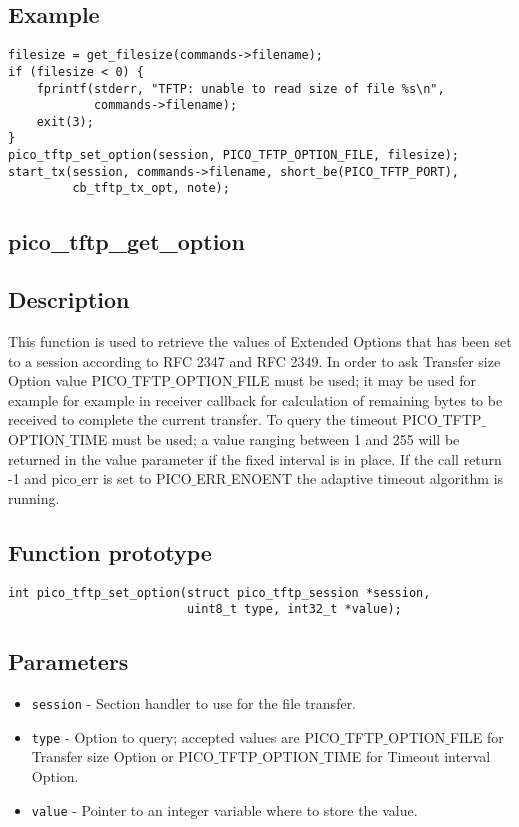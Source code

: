 \subsection*{Example}
\begin{verbatim}
filesize = get_filesize(commands->filename);
if (filesize < 0) {
    fprintf(stderr, "TFTP: unable to read size of file %s\n",
            commands->filename);
    exit(3);
}
pico_tftp_set_option(session, PICO_TFTP_OPTION_FILE, filesize);
start_tx(session, commands->filename, short_be(PICO_TFTP_PORT),
         cb_tftp_tx_opt, note);
\end{verbatim}


\subsection{pico\_tftp\_get\_option}

\subsection*{Description}
This function is used to retrieve the values of Extended Options that has been set to a session according to RFC 2347 and RFC 2349.
In order to ask Transfer size Option value PICO$\_$TFTP$\_$OPTION$\_$FILE must be used; it may be used for example for example in receiver callback for calculation of remaining bytes to be received to complete the current transfer.
To query the timeout PICO$\_$TFTP$\_$OPTION$\_$TIME must be used; a value ranging between 1 and 255 will be returned in the value parameter if the fixed interval is in place. If the call return -1 and pico$\_$err is set to PICO$\_$ERR$\_$ENOENT the adaptive timeout algorithm is running.

\subsection*{Function prototype}
\begin{verbatim}
int pico_tftp_set_option(struct pico_tftp_session *session,
                         uint8_t type, int32_t *value);
\end{verbatim}

\subsection*{Parameters}
\begin{itemize}[noitemsep]
\item \texttt{session} - Section handler to use for the file transfer.
\item \texttt{type} - Option to query; accepted values are PICO$\_$TFTP$\_$OPTION$\_$FILE for Transfer size Option or PICO$\_$TFTP$\_$OPTION$\_$TIME for Timeout interval Option.
\item \texttt{value} - Pointer to an integer variable where to store the value.
\end{itemize}

